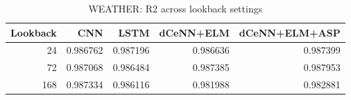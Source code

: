 \begin{table}
\caption{WEATHER: R2 across lookback settings}
\begin{tabular}{rrrrr}
\toprule
Lookback & CNN & LSTM & dCeNN+ELM & dCeNN+ELM+ASP \\
\midrule
24 & 0.986762 & 0.987196 & 0.986636 & 0.987399 \\
72 & 0.987068 & 0.986484 & 0.987385 & 0.987953 \\
168 & 0.987334 & 0.986116 & 0.981988 & 0.982881 \\
\bottomrule
\end{tabular}
\end{table}
